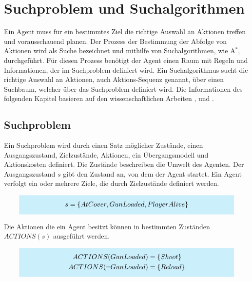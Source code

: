 \newcommand{\highlightbox}[2]{%
    \colorbox{cyan!20}{%
        \parbox{#1}{\vspace{0.5em}\centering #2\vspace{0.5em}}%
    }%
}


\chapter{Suchproblem und Suchalgorithmen}

Ein Agent muss für ein bestimmtes Ziel die richtige Auswahl an Aktionen treffen und vorausschauend planen. Der Prozess der Bestimmung der Abfolge von Aktionen wird als Suche bezeichnet und mithilfe von Suchalgorithmen, wie A$^*$, durchgeführt. Für diesen Prozess benötigt der Agent einen Raum mit Regeln und Informationen, der im Suchproblem definiert wird. Ein Suchalgorithmus sucht die richtige Auswahl an Aktionen, auch Aktions-Sequenz genannt, über einen Suchbaum, welcher über das Suchproblem definiert wird. Die Informationen des folgenden Kapitel basieren auf den wissenschaftlichen Arbeiten \autocite{RN2020}, \autocite{4082128} und \autocite{Felner2011}.

\section{Suchproblem}

Ein Suchproblem wird durch einen Satz möglicher Zustände, einen Ausgangszustand, Zielzustände, Aktionen, ein Übergangsmodell und Aktionskosten definiert. Die Zustände beschreiben die Umwelt des Agenten. Der Ausgangszustand $s$ gibt den Zustand an, von dem der Agent startet. Ein Agent verfolgt ein oder mehrere Ziele, die durch Zielzustände definiert werden.

\[
\highlightbox{0.9\textwidth}{$
    \begin{aligned}
			s = \{AtCover, GunLoaded, PlayerAlive\}
    \end{aligned}
$}
\]

Die Aktionen die ein Agent besitzt können in bestimmten Zuständen $ACTIONS(s)$ ausgeführt werden.

\[
\highlightbox{0.9\textwidth}{$
    \begin{aligned}
			ACTIONS(GunLoaded) &= \{Shoot\} \\
			ACTIONS(\lnot GunLoaded) &= \{Reload\}
    \end{aligned}
$}
\]

